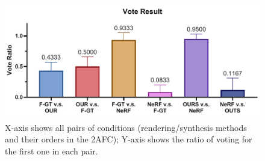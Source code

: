 \begin{figure}[ht]
    \centering
    \includegraphics[width=0.96\linewidth]{TOG/figs/vote-average-mono.pdf}
    {%
    X-axis shows all pairs of conditions (rendering/synthesis methods and their orders in the 2AFC); Y-axis shows the ratio of voting for the first one in each pair.
    }
    \label{fig:results:2afc}
\end{figure}